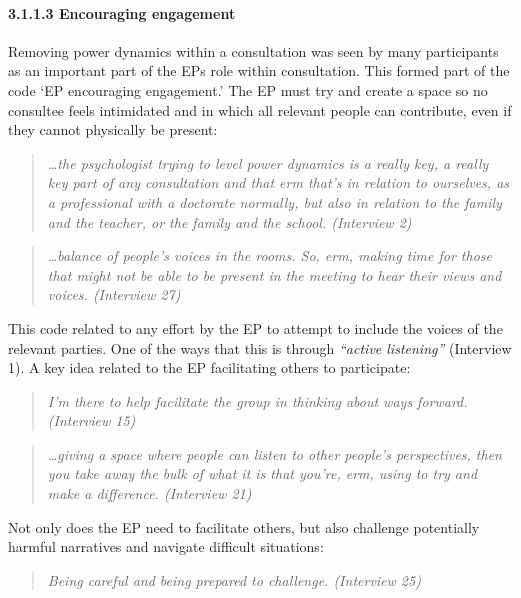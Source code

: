 \documentclass[
]{article}
\begin{document}
\hypertarget{encouraging-engagement}{%
\paragraph{3.1.1.3 Encouraging
engagement}\label{encouraging-engagement}}

Removing power dynamics within a consultation was seen by many
participants as an important part of the EPs role within consultation.
This formed part of the code `EP encouraging engagement.' The EP must
try and create a space so no consultee feels intimidated and in which
all relevant people can contribute, even if they cannot physically be
present:

\begin{quote}
\emph{\ldots the psychologist trying to level power dynamics is a really
key, a really key part of any consultation and that erm that's in
relation to ourselves, as a professional with a doctorate normally, but
also in relation to the family and the teacher, or the family and the
school. (Interview 2)}
\end{quote}

\begin{quote}
\emph{\ldots balance of people's voices in the rooms. So, erm, making
time for those that might not be able to be present in the meeting to
hear their views and voices. (Interview 27)}
\end{quote}

This code related to any effort by the EP to attempt to include the
voices of the relevant parties. One of the ways that this is through
\emph{``active listening''} (Interview 1). A key idea related to the EP
facilitating others to participate:

\begin{quote}
\emph{I'm there to help facilitate the group in thinking about ways
forward. (Interview 15)}
\end{quote}

\begin{quote}
\emph{\ldots giving a space where people can listen to other people's
perspectives, then you take away the bulk of what it is that you're,
erm, using to try and make a difference. (Interview 21)}
\end{quote}

Not only does the EP need to facilitate others, but also challenge
potentially harmful narratives and navigate difficult situations:

\begin{quote}
\emph{Being careful and being prepared to challenge. (Interview 25)}
\end{quote}
\end{document}
